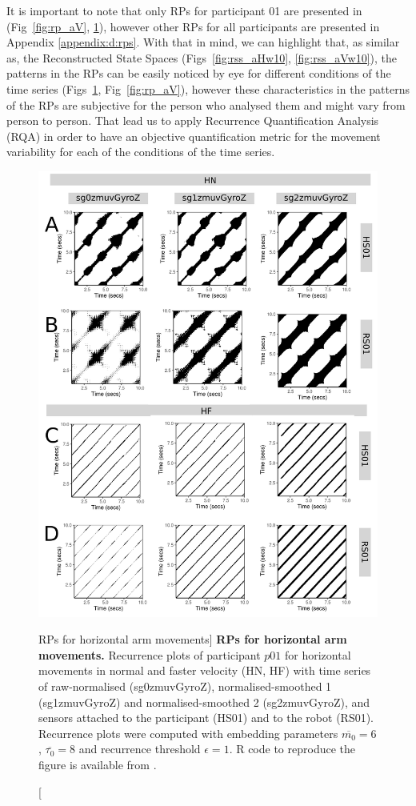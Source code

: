 It is important to note that only RPs for participant 01 are presented
in (Fig~\ref{fig:rp_aV}, \ref{fig:rp_aH}), however
other RPs for all participants are presented in Appendix \ref{appendix:d:rps}.
With that in mind, we can highlight that, as similar as, the 
Reconstructed State Spaces (Figs~\ref{fig:rss_aHw10}, \ref{fig:rss_aVw10}), 
the patterns in the RPs can be easily noticed by eye for different conditions 
of the time series (Figs~\ref{fig:rp_aH}, Fig~\ref{fig:rp_aV}),
however these characteristics in the patterns of the RPs are subjective 
for the person who analysed them and might vary from person to person. 
That lead us to apply Recurrence Quantification Analysis (RQA) in order 
to have an objective quantification metric for the movement variability 
for each of the conditions of the time series.
\begin{figure}
\centering
\includegraphics[height=0.80\textheight]{fig_6_06}
\caption
	[RPs for horizontal arm movements]{
	{\bf RPs for horizontal arm movements.}	
	Recurrence plots %
	of participant $p01$ for horizontal movements in normal and faster 
	velocity (HN, HF) with time series of raw-normalised (sg0zmuvGyroZ), 
	normalised-smoothed 1 (sg1zmuvGyroZ) and 
	normalised-smoothed 2 (sg2zmuvGyroZ), and 
	sensors attached to the participant (HS01) and to the robot (RS01).
	Recurrence plots were computed with 
	embedding parameters $\overline{m_0}=6$, $\overline{\tau_0}=8$ and
	recurrence threshold $\epsilon=1$.
	R code to reproduce the figure is available from \cite{hwum2018}.
        }
    \label{fig:rp_aH}
\end{figure}
